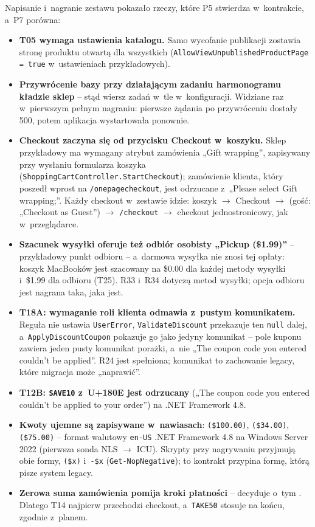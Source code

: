 Napisanie i~nagranie zestawu pokazało rzeczy, które P5 stwierdza w~kontrakcie, a~P7
porówna:
\begin{itemize}
  \item \textbf{T05 wymaga ustawienia katalogu.} Samo wycofanie publikacji zostawia stronę
    produktu otwartą dla wszystkich (\texttt{AllowViewUnpublishedProductPage = true}
    w~ustawieniach przykładowych).
  \item \textbf{Przywrócenie bazy przy działającym zadaniu harmonogramu kładzie sklep} --
    stąd wiersz zadań w~tle w~konfiguracji. Widziane raz w~pierwszym pełnym nagraniu:
    pierwsze żądania po przywróceniu dostały 500, potem aplikacja wystartowała ponownie.
  \item \textbf{Checkout zaczyna się od przycisku Checkout w~koszyku.} Sklep przykładowy
    ma wymagany atrybut zamówienia „Gift wrapping”, zapisywany przy wysłaniu formularza
    koszyka (\texttt{ShoppingCartController.StartCheckout}); zamówienie klienta, który
    poszedł wprost na \texttt{/onepagecheckout}, jest odrzucane z~„Please select Gift
    wrapping;”. Każdy checkout w~zestawie idzie: koszyk $\rightarrow$ Checkout
    $\rightarrow$ (gość: „Checkout as Guest”) $\rightarrow$ \texttt{/checkout}
    $\rightarrow$ checkout jednostronicowy, jak w~przeglądarce.
  \item \textbf{Szacunek wysyłki oferuje też odbiór osobisty „Pickup (\$1.99)”} --
    przykładowy punkt odbioru -- a~darmowa wysyłka nie znosi tej opłaty: koszyk MacBooków
    jest szacowany na \$0.00 dla każdej metody wysyłki i~\$1.99 dla odbioru (T25). R33
    i~R34 dotyczą metod wysyłki; opcja odbioru jest nagrana taka, jaka jest.
  \item \textbf{T18A: wymaganie roli klienta odmawia z~pustym komunikatem.} Reguła nie
    ustawia \texttt{UserError}, \texttt{ValidateDiscount} przekazuje ten \texttt{null}
    dalej, a~\texttt{ApplyDiscountCoupon} pokazuje go jako jedyny komunikat -- pole kuponu
    zawiera jeden pusty komunikat porażki, a~nie „The coupon code you entered couldn't be
    applied”. R24 jest spełniona; komunikat to zachowanie legacy, które migracja może
    „naprawić”.
  \item \textbf{T12B: \texttt{SAVE10} z~U+180E jest odrzucany} („The coupon code you
    entered couldn't be applied to your order”) na .NET Framework 4.8.
  \item \textbf{Kwoty ujemne są zapisywane w~nawiasach}: \texttt{(\$100.00)},
    \texttt{(\$34.00)}, \texttt{(\$75.00)} -- format walutowy \texttt{en-US} .NET Framework
    4.8 na Windows Server 2022 (pierwsza sonda NLS $\rightarrow$ ICU). Skrypty przy
    nagrywaniu przyjmują obie formy, \texttt{(\$x)} i~\texttt{-\$x}
    (\texttt{Get-NopNegative}); to kontrakt przypina formę, którą pisze system legacy.
  \item \textbf{Zerowa suma zamówienia pomija kroki płatności} -- decyduje o~tym
    . Dlatego T14 najpierw
    przechodzi checkout, a~\texttt{TAKE50} stosuje na końcu, zgodnie z~planem.
\end{itemize}

